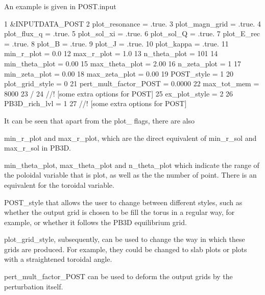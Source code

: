 An example is given in {\ttfamily P\+O\+S\+T.\+input} 
\begin{DoxyCodeInclude}
1 &INPUTDATA\_POST
2     plot\_resonance          = .true.
3     plot\_magn\_grid          = .true.
4     plot\_flux\_q             = .true.
5     plot\_sol\_xi             = .true.
6     plot\_sol\_Q              = .true.
7     plot\_E\_rec              = .true.
8     plot\_B                  = .true.
9     plot\_J                  = .true.
10     plot\_kappa              = .true.
11     min\_r\_plot              = 0.0
12     max\_r\_plot              = 1.0
13     n\_theta\_plot            = 101
14     min\_theta\_plot          = 0.00
15     max\_theta\_plot          = 2.00
16     n\_zeta\_plot             = 1
17     min\_zeta\_plot           = 0.00
18     max\_zeta\_plot           = 0.00
19     POST\_style              = 1
20     plot\_grid\_style         = 0
21     pert\_mult\_factor\_POST   = 0.0000
22     max\_tot\_mem             = 8000
23 /
24 //! [some extra options for POST]
25     ex\_plot\_style           = 2
26     PB3D\_rich\_lvl           = 1
27 //! [some extra options for POST]
\end{DoxyCodeInclude}
 It can be seen that apart from the {\ttfamily plot\+\_\+} flags, there are also
\begin{DoxyItemize}
\item {\ttfamily min\+\_\+r\+\_\+plot} and {\ttfamily max\+\_\+r\+\_\+plot}, which are the direct equivalent of {\ttfamily min\+\_\+r\+\_\+sol} and {\ttfamily max\+\_\+r\+\_\+sol} in P\+B3D.
\item {\ttfamily min\+\_\+theta\+\_\+plot}, {\ttfamily max\+\_\+theta\+\_\+plot} and {\ttfamily n\+\_\+theta\+\_\+plot} which indicate the range of the poloidal variable that is plot, as well as the the number of point. There is an equivalent for the toroidal variable.
\item {\ttfamily P\+O\+S\+T\+\_\+style} that allows the user to change between different styles, such as whether the output grid is chosen to be fill the torus in a regular way, for example, or whether it follows the P\+B3D equilibrium grid.
\item {\ttfamily plot\+\_\+grid\+\_\+style}, subsequently, can be used to change the way in which these grids are produced. For example, they could be changed to slab plots or plots with a straightened toroidal angle.
\item {\ttfamily pert\+\_\+mult\+\_\+factor\+\_\+\+P\+O\+ST} can be used to deform the output grids by the perturbation itself.
\end{DoxyItemize}

